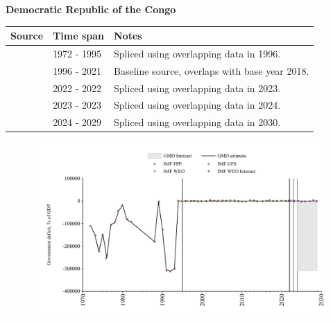 \documentclass[12pt,a4paper,landscape]{article}
\begin{document}
\begin{adjustbox}{max totalsize={\paperwidth}{\paperheight},center}
\begin{minipage}[t][\textheight][t]{\textwidth}
\vspace*{0.5cm}
{}
\begin{center}
{\Large\bfseries Democratic Republic of the Congo}
\end{center}
\vspace{0.5cm}
\begin{table}[H]
\centering
\small
\begin{tabular}{|l|l|l|}
\hline
\textbf{Source} & \textbf{Time span} & \textbf{Notes} \\
\hline
\rowcolor{white}\cite{IMF_GFS}& 1972 - 1995 &Spliced using overlapping data in 1996.\\
\rowcolor{lightgray}\cite{IMF_WEO}& 1996 - 2021 &Baseline source, overlaps with base year 2018.\\
\rowcolor{white}\cite{IMF_GFS}& 2022 - 2022 &Spliced using overlapping data in 2023.\\
\rowcolor{lightgray}\cite{IMF_FPP}& 2023 - 2023 &Spliced using overlapping data in 2024.\\
\rowcolor{white}\cite{IMF_WEO_forecast}& 2024 - 2029 &Spliced using overlapping data in 2030.\\
\hline
\end{tabular}
\end{table}
\begin{figure}[H]
\centering
\includegraphics[width=\textwidth,height=0.6\textheight,keepaspectratio]{graphs/COD_govdef_GDP.pdf}
\end{figure}
\end{minipage}
\end{adjustbox}
\end{document}
